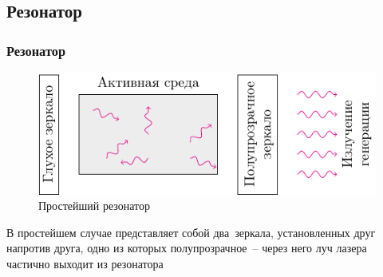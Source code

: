 \documentclass[10pt,pdf,hyperref={unicode}, dvipsnames]{beamer}
\newcommand\frametitless[1]{\subsection{#1}\frametitle{#1}}
\begin{document}
\begin{frame}[t]
	\frametitless{Резонатор}

	\vfill
	\begin{figure}[h]
		\centering
		\includegraphics[]{images/resonator}
		\caption{Простейший резонатор}
	\end{figure}	
	\vfill 
	В простейшем случае представляет собой два зеркала, установленных друг напротив друга, одно из которых полупрозрачное -- через него луч лазера частично выходит из резонатора
\end{frame}


\end{document}
